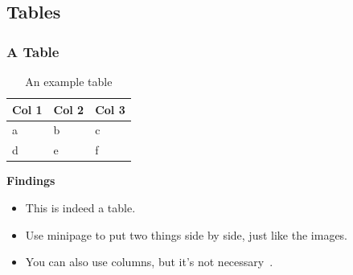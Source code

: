 \documentclass[
	10pt, %
	aspectratio=169, %
]{beamer}
\begin{document}
\subsection{Tables}
\begin{frame}
	\frametitle{A Table}
	\centering
	\begin{minipage}{0.3\linewidth}
		\begin{table}
			\centering
			{\small
				\begin{tabular}[c]{lll}
					\toprule
					\textbf{Col 1} & \textbf{Col 2} & \textbf{Col 3} \\ \midrule
					a              & b              & c              \\
					d              & e              & f              \\
					\bottomrule
				\end{tabular}
			}
			\caption{An example table}
			\label{tab:}
		\end{table}
	\end{minipage}
	\begin{minipage}{0.6\linewidth}
		\textbf{Findings}\par
		\begin{itemize}
			\item This is indeed a table.
			\item Use minipage to put two things side by side, just like the images.
			\item You can also use columns, but it's not necessary~\cite{scharrerAnswerMinipageColumns2011}.
		\end{itemize}
	\end{minipage}
\end{frame}
\end{document}

